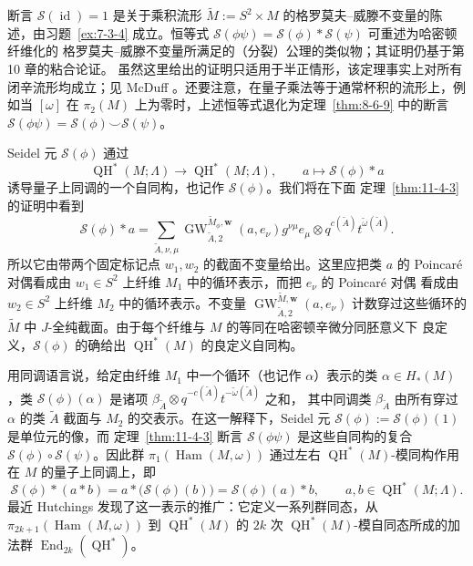 断言 $\mathcal S(\operatorname{id})=1$ 是关于乘积流形
$\widetilde M:=S^2\times M$ 的格罗莫夫--威滕不变量的陈述，由习题~\ref{ex:7-3-4}
成立。恒等式
$\mathcal S(\phi\psi)=\mathcal S(\phi)*\mathcal S(\psi)$ 可重述为哈密顿纤维化的
格罗莫夫--威滕不变量所满足的（分裂）公理的类似物；其证明仍基于第 10 章的粘合论证。
虽然这里给出的证明只适用于半正情形，该定理事实上对所有闭辛流形均成立；见 McDuff
。还要注意，在量子乘法等于通常杯积的流形上，例如当 $[\omega]$ 在
$\pi_2(M)$ 上为零时，上述恒等式退化为定理~\ref{thm:8-6-9} 中的断言
$\mathcal S(\phi\psi)=\mathcal S(\phi)\smile\mathcal S(\psi)$。

\begin{remark}\label{rem:11-4-4}
Seidel 元 $\mathcal S(\phi)$ 通过
\[
  \operatorname{QH}^*(M;\Lambda)\longrightarrow
  \operatorname{QH}^*(M;\Lambda),
  \qquad a\longmapsto\mathcal S(\phi)*a
\]
诱导量子上同调的一个自同构，也记作 $\mathcal S(\phi)$。我们将在下面
定理~\ref{thm:11-4-3} 的证明中看到
\begin{equation}\label{eq:11-4-4}
  \mathcal S(\phi)*a
  =\sum_{\widetilde A,\nu,\mu}
  \operatorname{GW}^{\widetilde M_\phi,\mathbf w}_{\widetilde A,2}(a,e_\nu)
  g^{\nu\mu}e_\mu\otimes
  q^{c(\widetilde A)}t^{\widetilde\omega(\widetilde A)}.
\end{equation}
所以它由带两个固定标记点 $w_1,w_2$ 的截面不变量给出。这里应把类 $a$ 的 Poincar\'e
对偶看成由 $w_1\in S^2$ 上纤维 $M_1$ 中的循环表示，而把 $e_\nu$ 的 Poincar\'e 对偶
看成由 $w_2\in S^2$ 上纤维 $M_2$ 中的循环表示。不变量
$\operatorname{GW}^{\widetilde M,\mathbf w}_{\widetilde A,2}(a,e_\nu)$ 计数穿过这些循环的
$\widetilde M$ 中 $J$-全纯截面。由于每个纤维与 $M$ 的等同在哈密顿辛微分同胚意义下
良定义，$\mathcal S(\phi)$ 的确给出 $\operatorname{QH}^*(M)$ 的良定义自同构。

用同调语言说，给定由纤维 $M_1$ 中一个循环（也记作 $\alpha$）表示的类
$\alpha\in H_*(M)$，类 $\mathcal S(\phi)(\alpha)$ 是诸项
$\beta_{\widetilde A}\otimes q^{-c(\widetilde A)}t^{-\widetilde\omega(\widetilde A)}$ 之和，
其中同调类 $\beta_{\widetilde A}$ 由所有穿过 $\alpha$ 的类 $\widetilde A$ 截面与 $M_2$
的交表示。在这一解释下，Seidel 元
$\mathcal S(\phi):=\mathcal S(\phi)(1)$ 是单位元的像，而
定理~\ref{thm:11-4-3} 断言 $\mathcal S(\phi\psi)$ 是这些自同构的复合
$\mathcal S(\phi)\circ\mathcal S(\psi)$。因此群
$\pi_1(\operatorname{Ham}(M,\omega))$ 通过左右
$\operatorname{QH}^*(M)$-模同构作用在 $M$ 的量子上同调上，即
\[
  \mathcal S(\phi)*(a*b)
  =a*\bigl(\mathcal S(\phi)(b)\bigr)
  =\mathcal S(\phi)(a)*b,
  \qquad a,b\in\operatorname{QH}^*(M;\Lambda).
\]
最近 Hutchings  发现了这一表示的推广：它定义一系列群同态，从
$\pi_{2k+1}(\operatorname{Ham}(M,\omega))$ 到 $\operatorname{QH}^*(M)$ 的
$2k$ 次 $\operatorname{QH}^*(M)$-模自同态所成的加法群
$\operatorname{End}_{2k}(\operatorname{QH}^*)$。
\end{remark}

